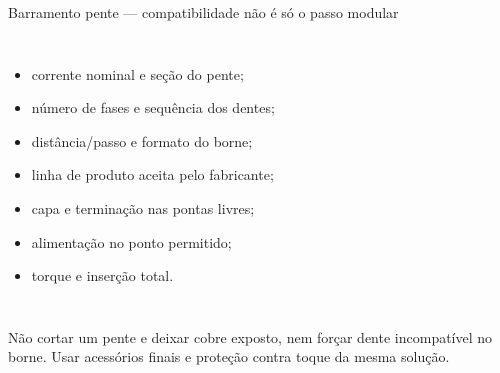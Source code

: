 \begin{frame}{Barramento pente — compatibilidade não é só o passo modular}
\small
\begin{columns}[T,onlytextwidth]
\begin{itemize}
\item corrente nominal e seção do pente;
\item número de fases e sequência dos dentes;
\item distância/passo e formato do borne;
\item linha de produto aceita pelo fabricante;
\item capa e terminação nas pontas livres;
\item alimentação no ponto permitido;
\item torque e inserção total.
\end{itemize}
\end{columns}
\begin{caixaAt}
Não cortar um pente e deixar cobre exposto, nem forçar dente incompatível no borne. Usar acessórios finais e proteção contra toque da mesma solução.
\end{caixaAt}
\end{frame}

